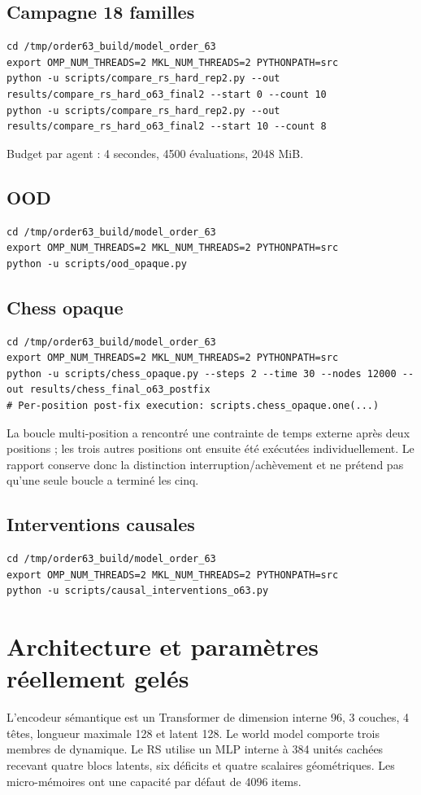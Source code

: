\documentclass[11pt,a4paper]{article}
\begin{document}
\subsection{Campagne 18 familles}
\begin{lstlisting}
cd /tmp/order63_build/model_order_63
export OMP_NUM_THREADS=2 MKL_NUM_THREADS=2 PYTHONPATH=src
python -u scripts/compare_rs_hard_rep2.py --out results/compare_rs_hard_o63_final2 --start 0 --count 10
python -u scripts/compare_rs_hard_rep2.py --out results/compare_rs_hard_o63_final2 --start 10 --count 8
\end{lstlisting}
Budget par agent : 4 secondes, 4500 évaluations, 2048 MiB.

\subsection{OOD}
\begin{lstlisting}
cd /tmp/order63_build/model_order_63
export OMP_NUM_THREADS=2 MKL_NUM_THREADS=2 PYTHONPATH=src
python -u scripts/ood_opaque.py
\end{lstlisting}

\subsection{Chess opaque}
\begin{lstlisting}
cd /tmp/order63_build/model_order_63
export OMP_NUM_THREADS=2 MKL_NUM_THREADS=2 PYTHONPATH=src
python -u scripts/chess_opaque.py --steps 2 --time 30 --nodes 12000 --out results/chess_final_o63_postfix
# Per-position post-fix execution: scripts.chess_opaque.one(...)
\end{lstlisting}
La boucle multi-position a rencontré une contrainte de temps externe après deux positions ; les trois autres positions ont ensuite été exécutées individuellement. Le rapport conserve donc la distinction interruption/achèvement et ne prétend pas qu’une seule boucle a terminé les cinq.

\subsection{Interventions causales}
\begin{lstlisting}
cd /tmp/order63_build/model_order_63
export OMP_NUM_THREADS=2 MKL_NUM_THREADS=2 PYTHONPATH=src
python -u scripts/causal_interventions_o63.py
\end{lstlisting}

\section{Architecture et paramètres réellement gelés}
L’encodeur sémantique est un Transformer de dimension interne 96, 3 couches, 4 têtes, longueur maximale 128 et latent 128. Le world model comporte trois membres de dynamique. Le RS utilise un MLP interne à 384 unités cachées recevant quatre blocs latents, six déficits et quatre scalaires géométriques. Les micro-mémoires ont une capacité par défaut de 4096 items.
\end{document}
